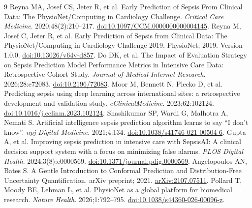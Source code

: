 \documentclass[11pt,a4paper]{article}
\begin{document}
\begin{thebibliography}{9}
 Reyna MA, Josef CS, Jeter R, et al. Early Prediction of Sepsis From Clinical Data: The PhysioNet/Computing in Cardiology Challenge. \textit{Critical Care Medicine}. 2020;48(2):210--217. \href{https://doi.org/10.1097/CCM.0000000000004145}{doi:10.1097/CCM.0000000000004145}.
 Reyna M, Josef C, Jeter R, et al. Early Prediction of Sepsis from Clinical Data: The PhysioNet/Computing in Cardiology Challenge 2019. PhysioNet; 2019. Version 1.0.0. \href{https://doi.org/10.13026/v64v-d857}{doi:10.13026/v64v-d857}.
 Do DK, et al. The Impact of Evaluation Strategy on Sepsis Prediction Model Performance Metrics in Intensive Care Data: Retrospective Cohort Study. \textit{Journal of Medical Internet Research}. 2026;28:e72083. \href{https://doi.org/10.2196/72083}{doi:10.2196/72083}.
 Moor M, Bennett N, Plecko D, et al. Predicting sepsis using deep learning across international sites: a retrospective development and validation study. \textit{eClinicalMedicine}. 2023;62:102124. \href{https://doi.org/10.1016/j.eclinm.2023.102124}{doi:10.1016/j.eclinm.2023.102124}.
 Shashikumar SP, Wardi G, Malhotra A, Nemati S. Artificial intelligence sepsis prediction algorithm learns to say ``I don't know''. \textit{npj Digital Medicine}. 2021;4:134. \href{https://doi.org/10.1038/s41746-021-00504-6}{doi:10.1038/s41746-021-00504-6}.
 Gupta A, et al. Improving sepsis prediction in intensive care with SepsisAI: A clinical decision support system with a focus on minimizing false alarms. \textit{PLOS Digital Health}. 2024;3(8):e0000569. \href{https://doi.org/10.1371/journal.pdig.0000569}{doi:10.1371/journal.pdig.0000569}.
 Angelopoulos AN, Bates S. A Gentle Introduction to Conformal Prediction and Distribution-Free Uncertainty Quantification. arXiv preprint; 2021. \href{https://arxiv.org/abs/2107.07511}{arXiv:2107.07511}.
 Pollard T, Moody BE, Lehman L, et al. PhysioNet as a global platform for biomedical research. \textit{Nature Health}. 2026;1:792--795. \href{https://doi.org/10.1038/s44360-026-00096-z}{doi:10.1038/s44360-026-00096-z}.
\end{thebibliography}
\end{document}
